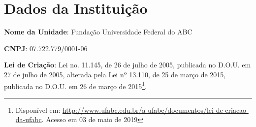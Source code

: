 
\section{Dados da Instituição}

\textbf{Nome da Unidade}: Fundação Universidade Federal do ABC

\textbf{CNPJ}: 07.722.779/0001-06

\textbf{Lei de Criação}: Lei no. 11.145, de 26 de julho de 2005, publicada no D.O.U. em 27 de julho de 2005, alterada pela Lei nº 13.110, de 25 de março de 2015, publicada no D.O.U. em 26 de março de 2015\footnote{Disponível em: \url{http://www.ufabc.edu.br/a-ufabc/documentos/lei-de-criacao-da-ufabc}. Acesso em 03 de maio de 2019}.
